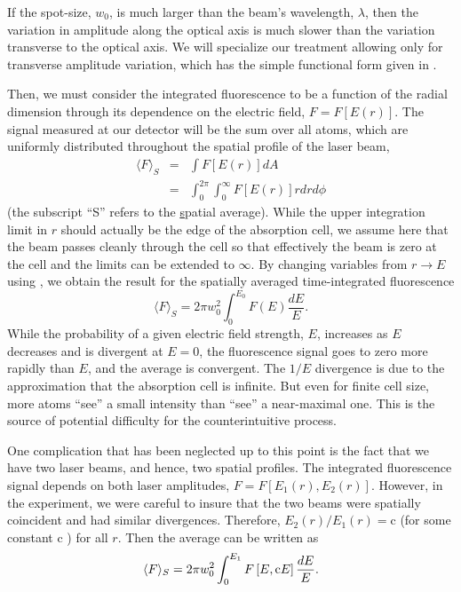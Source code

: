 If the spot-size, $w_0$, is much larger than the beam's wavelength, $\lambda$,
then the variation in amplitude along the optical axis is much slower than the
variation transverse to the optical axis.  We will specialize our treatment
allowing only for transverse amplitude variation, which has the simple
functional form given in .

Then, we must consider the integrated fluorescence to be a function of the
radial dimension through its dependence on the electric field,
$F = F\left[E(r)\right]$.  The signal measured at our detector will be
the sum over all atoms, which are uniformly distributed throughout the
spatial profile of the laser beam, 
\begin{eqnarray}
\langle F \rangle_S &=& \int F\left[E(r)\right] dA \\
&=& \int_0^{2\pi}\!\!\int_{0}^{\infty}F\left[E(r)\right] r dr d\phi
\end{eqnarray}
(the subscript ``S'' refers to the \underline{s}patial average).
While the upper integration limit in $r$ should actually be the edge of the
absorption cell, we assume here that the beam passes cleanly through the cell
so that effectively the beam is zero at the cell and the limits can be
extended to $\infty$.  By changing variables from $r \rightarrow E$ using
, we obtain the result for the spatially averaged time-integrated
fluorescence
\begin{equation}
\langle F \rangle_S = 2\pi w_0^2 \int_0^{E_0} F(E) \frac{dE}{E}.
\end{equation}
While the probability of a given electric field strength, $E$, increases as $E$
decreases and is divergent at $E=0$, the fluorescence signal goes
to zero more rapidly than $E$, and the average is convergent.  The
$1/E$ divergence is due to the approximation that the absorption cell is
infinite. But even for finite cell size, more atoms ``see'' a small intensity
than ``see'' a near-maximal one.  This is the source of potential difficulty for
the counterintuitive process. 

One complication that has been neglected up to this point is the fact that we
have two laser beams, and hence, two spatial profiles.  The integrated
fluorescence signal depends on both laser amplitudes, $F =
F\left[E_1(r),E_2(r)\right]$.  However, in the experiment, we were careful
to insure that the two beams were spatially coincident and had similar
divergences. Therefore,
$E_2(r)/E_1(r) = $c
(for some constant c ) for all $r$.  Then the average can be written as
\begin{equation}
\langle F \rangle_S = 2\pi w_0^2 \int_0^{E_1} F\left[E, {\rm
c}E\right]
\frac{dE}{E}.
\label{spatial_eq}
\end{equation}

